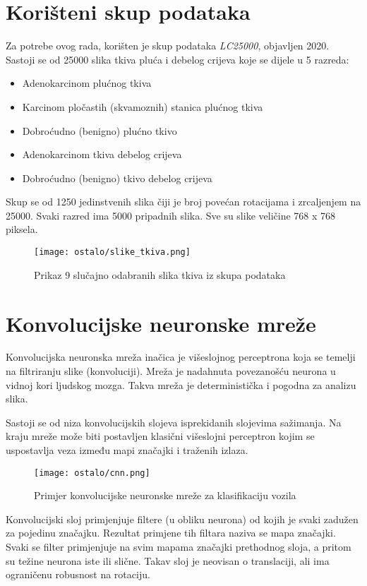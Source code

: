 \documentclass[conference, utf8]{IEEEtran}
\begin{document}
	\section{Korišteni skup podataka}
	Za potrebe ovog rada, korišten je skup podataka \textit{LC25000}, objavljen 2020. \cite{borkowski2019lung} Sastoji se od 25000 slika tkiva pluća i debelog crijeva koje se dijele u 5 razreda:
	\begin{itemize}
		\item Adenokarcinom plućnog tkiva
		\item Karcinom pločastih (skvamoznih) stanica plućnog tkiva
		\item Dobroćudno (benigno) plućno tkivo
		\item Adenokarcinom tkiva debelog crijeva
		\item Dobroćudno (benigno) tkivo debelog crijeva
	\end{itemize}
	
	Skup se od 1250 jedinstvenih slika čiji je broj povećan rotacijama i zrcaljenjem na 25000. Svaki razred ima 5000 pripadnih slika. Sve su slike veličine 768 x 768 piksela. 
	
	\begin{figure}[H]
		\centering
		\texttt{[image: ostalo/slike\_tkiva.png]}
		\caption{Prikaz 9 slučajno odabranih slika tkiva iz skupa podataka}
		\label{fig:tissue_images}
	\end{figure}
	
	\section{Konvolucijske neuronske mreže}
	Konvolucijska neuronska mreža inačica je višeslojnog perceptrona koja se temelji na filtriranju slike (konvoluciji). Mreža je nadahnuta povezanošću neurona u vidnoj kori ljudskog mozga.  Takva mreža je deterministička i pogodna za analizu slika. 
	
	Sastoji se od niza konvolucijskih slojeva isprekidanih slojevima sažimanja. Na kraju mreže može biti postavljen klasični višeslojni perceptron kojim se uspostavlja veza između mapi značajki i traženih izlaza. 
	
	\begin{figure}[H]
		\centering
		\texttt{[image: ostalo/cnn.png]}
		\caption{Primjer konvolucijske neuronske mreže za klasifikaciju vozila\cite{Saha_2023}}
		\label{fig:cnn}
	\end{figure}
	
	Konvolucijski sloj primjenjuje filtere (u obliku neurona) od kojih je svaki zadužen za pojedinu značajku. Rezultat primjene tih filtara naziva se mapa značajki. Svaki se filter primjenjuje na svim mapama značajki prethodnog sloja, a pritom su težine neurona iste ili slične. Takav sloj je neovisan o translaciji, ali ima ograničenu robusnost na rotaciju. 
	
\end{document}
